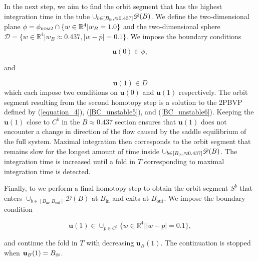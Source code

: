 \documentclass{ws-ijbc}
\begin{document}
In the next step, we aim to find the orbit segment that has the highest integration time in the tube $\cup_{b\in[B_{\textsc{in}}, \approx 0.437]} \mathscr{D}(B)$.  We define the two-dimensional plane $\phi = \phi_{\textsc{hom2}} \cap \{w \in \mathbb{R}^4 | w_B=1.0 \}$ and the two-dimensional sphere  $\mathscr{D} = \{w \in \mathbb{R}^4 | w_B \approx 0.437, |w-\bar{p}| = 0.1\}$.  We impose the boundary conditions

\begin{equation}
\mathbf{u}(0) \in \phi,
\label{BC_unstable5}
\end{equation}

and

\begin{equation}
\mathbf{u}(1) \in D
\label{BC_unstable6}
\end{equation}
\noindent
which each impose two conditions on $\mathbf{u}(0)$ and $\mathbf{u}(1)$ respectively.  The orbit segment resulting from the second homotopy step is a solution to the 2PBVP defined by (\ref{equation_4}), (\ref{BC_unstable5}), and (\ref{BC_unstable6}).  Keeping the $\mathbf{u}(1)$ close to $C^b$ in the $B \approx 0.437$ section ensures that $\mathbf{u}(1)$ does not encounter a change in direction of the flow caused by the saddle equilibrium of the full system.  Maximal integration then corresponds to the orbit segment that remains slow for the longest amount of time inside $\cup_{b\in[B_{\textsc{in}}, \approx 0.437]} \mathscr{D}(B)$.  The integration time is increased until a fold in $T$ corresponding to maximal integration time is detected.

Finally, to we perform a final homotopy step to obtain the orbit segment $S^b$ that enters $\cup_{b\in[B_{\mathrm{in}}, B_{\mathrm{out}}]} \mathscr{D}(B)$ at $B_{\mathrm{in}}$ and exits at $B_{\mathrm{out}}$.  We impose the boundary condition

\begin{equation}
\mathbf{u}(1) \in \cup_{p \in C^b}\{w \in \mathbb{R}^4 | |w-p| = 0.1\},
\label{BC_unstable7}
\end{equation}

\noindent
and continue the fold in $T$ with decreasing $\mathbf{u}_B(1)$.  The continuation is stopped when $\mathbf{u}_B(1) = B_{\textsc{in}}$.
\end{document}

